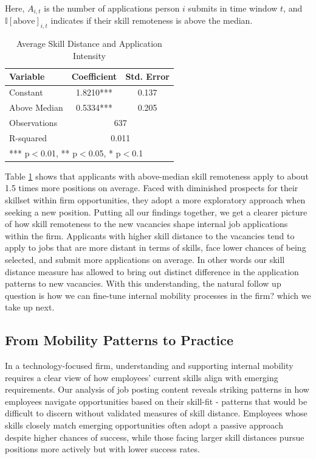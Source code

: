 \documentclass[12pt]{article}
\begin{document}
Here, $A_{i,t}$ is the number of applications person $i$ submits in time window $t$, and $\mathbb{I}[\text{above}]_{i,t}$ indicates if their skill remoteness is above the median.


\begin{table}[h]
\centering
\caption{Average Skill Distance and Application Intensity}
\renewcommand{\arraystretch}{1.2} %
\begin{tabular}{lcc}
\hline
\textbf{Variable} & \textbf{Coefficient} & \textbf{Std. Error} \\
\hline
Constant & 1.8210*** & 0.137 \\
Above Median & 0.5334*** & 0.205 \\
\hline
Observations & \multicolumn{2}{c}{637} \\
R-squared & \multicolumn{2}{c}{0.011} \\
\hline
\multicolumn{3}{l}{\small{*** p$<$0.01, ** p$<$0.05, * p$<$0.1}} \\
\end{tabular}
\label{tab:skill_remote_intensity} 
\end{table}


Table \ref{tab:skill_remote_intensity} shows that applicants with above-median skill remoteness apply to about 1.5 times more positions on average. Faced with diminished prospects for their skillset within firm opportunities, they adopt a more exploratory approach when seeking a new position. Putting all our findings together, we get a clearer picture of how skill remoteness to the new vacancies shape internal job applications within the firm. Applicants with higher skill distance to the vacancies tend to apply to jobs that are more distant in terms of skills, face lower chances of being selected, and submit more applications on average. In other words our skill distance measure has allowed to bring out distinct difference in the application patterns to new vacancies. With this understanding, the natural follow up question is how we can fine-tune internal mobility processes in the firm? which we take up next.




\subsection{From Mobility Patterns to Practice}

In a technology-focused firm, understanding and supporting internal mobility requires a clear view of how employees' current skills align with emerging requirements. Our analysis of job posting content reveals striking patterns in how employees navigate opportunities based on their skill-fit - patterns that would be difficult to discern without validated measures of skill distance. Employees whose skills closely match emerging opportunities often adopt a passive approach despite higher chances of success, while those facing larger skill distances pursue positions more actively but with lower success rates.
\end{document}
